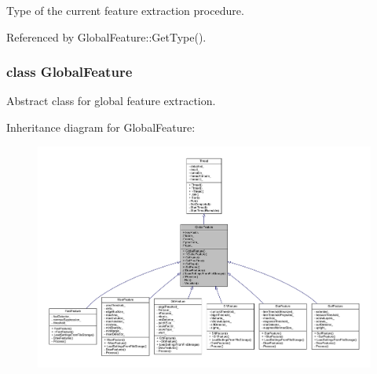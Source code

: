 Type of the current feature extraction procedure. 



Referenced by Global\-Feature\-::\-Get\-Type().

\label{class_global_feature}
\hypertarget{group___feature_extractor_class_global_feature}{}
\subsubsection{class Global\-Feature}
Abstract class for global feature extraction. 

Inheritance diagram for Global\-Feature\-:
\nopagebreak
\begin{figure}[H]
\begin{center}
\leavevmode
\includegraphics[width=350pt]{class_global_feature__inherit__graph}
\end{center}
\end{figure}


